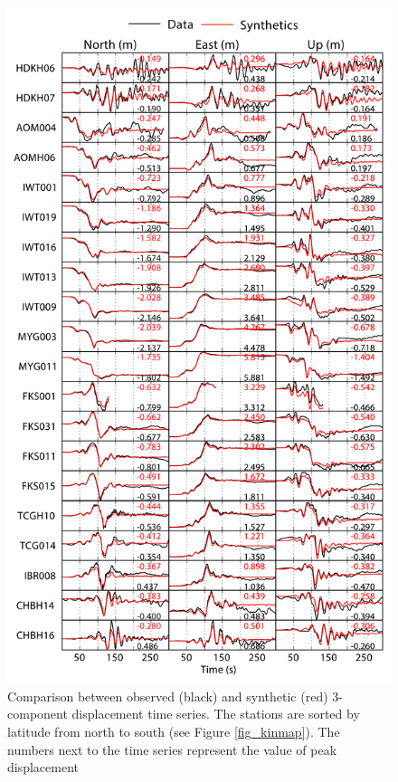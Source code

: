 \begin{figure}[!ht] 
  \centering
  \includegraphics[width=0.75\linewidth]{./figures/ch4/disp_data_vs_synthetics}
    \caption[Data fits No. 1 for the kinematic inversion]{Comparison between observed (black) and synthetic (red) 3-component displacement time series. The stations are sorted by latitude from north to south (see Figure \ref{fig_kinmap}). The numbers next to the time series represent the value of peak displacement}
  \label{fig_dispfits}
\end{figure}

